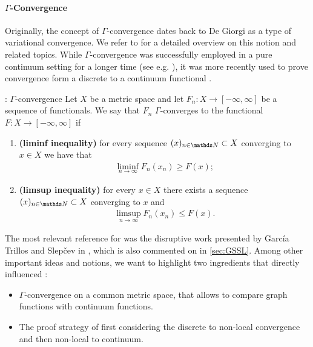 \paragraph{$\Gamma$-Convergence} Originally, the concept of $\Gamma$-convergence dates back to De Giorgi \cite{de1975tipo} as a type of variational convergence. We refer to \cite{Brad02, dal2012introduction} for a detailed overview on this notion and related topics. While $\Gamma$-convergence was successfully employed in a pure continuum setting for a longer time (see e.g. \cite{modica1977esempio}), it was more recently used to prove convergence form a discrete to a continuum functional \cite{chambolle2010continuous, braides2012quantitative, van2012gamma}. 
%
%
%
\begin{definition}{\cite{de1975tipo}: $\Gamma$-convergence}{}
Let $X$ be a metric space and let $F_n:X\rightarrow [-\infty,\infty]$ be a sequence of 
functionals. We say that $F_n$ $\Gamma$-converges to the functional 
$F:X\rightarrow [-\infty,\infty]$ if
\begin{enumerate}[label=(\roman*)]
	\item \textbf{(liminf inequality)} for every sequence $(x)_{n\in\N}\subset X$ converging to 
	$x\in X$ we have that
	\begin{align*}
		\liminf_{n\rightarrow\infty} F_n(x_n) \geq F(x);
	\end{align*}
	\item\textbf{(limsup inequality)} for every $x\in X$ there exists a sequence 
	$(x)_{n\in\N}\subset X$ converging to $x$ and 
	\begin{align*}
		\limsup_{n\rightarrow\infty} F_n(x_n)\leq F(x).
	\end{align*}
\end{enumerate}
\end{definition}
%
\noindent%
The most relevant reference for \cite{roith2022continuum} was the disruptive work presented by Garc\'ia Trillos and Slep\v{c}ev in \cite{GarcSlep15}, which is also commented on in \cref{sec:GSSL}. Among other important ideas and notions, we want to highlight two ingredients that directly influenced \cite{roith2022continuum}:
%
\begin{itemize}
\item $\Gamma$-convergence on a common metric space, that allows to compare graph functions with continuum functions.
\item The proof strategy of first considering the discrete to non-local convergence and then non-local to continuum.
\end{itemize}
